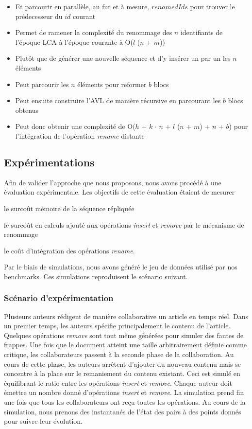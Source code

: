 \documentclass[12pt]{thesul}
\begin{document}
\begin{itemize}
  \item Et parcourir en parallèle, au fur et à mesure, $renamedIds$ pour trouver le prédecesseur du $id$ courant
  \item Permet de ramener la complexité du renommage des $n$ identifiants de l'époque \ac{LCA} à l'époque courante à O($l$ ($n$ + $m$))
  \item Plutôt que de générer une nouvelle séquence et d'y insérer un par un les $n$ éléments
  \item Peut parcourir les $n$ éléments pour reformer $b$ blocs
  \item Peut ensuite construire l'AVL de manière récursive en parcourant les $b$ blocs obtenus
  \item Peut donc obtenir une complexité de O($h$ + $k$ $\cdot$ $n$ + $l$ ($n$ + $m$) + $n$ + $b$) pour l'intégration de l'opération \emph{rename} distante
\end{itemize}

\subsection{Expérimentations}

Afin de valider l'approche que nous proposons, nous avons procédé à une évaluation expérimentale.
Les objectifs de cette évaluation étaient de mesurer
\begin{enumerate*}[label=(\roman*)]
  \item le surcoût mémoire de la séquence répliquée
  \item le surcoût en calculs ajouté aux opérations \emph{insert} et \emph{remove} par le mécanisme de renommage
  \item le coût d'intégration des opérations \emph{rename}.
\end{enumerate*}

Par le biais de simulations, nous avons généré le jeu de données utilisé par nos benchmarks.
Ces simulations reproduisent le scénario suivant.

\subsubsection{Scénario d'expérimentation}

Plusieurs auteurs rédigent de manière collaborative un article en temps réel.
Dans un premier temps, les auteurs spécifie principalement le contenu de l'article.
Quelques opérations \emph{remove} sont tout même générées pour simuler des fautes de frappes.
Une fois que le document atteint une taille arbitrairement définie comme critique, les collaborateurs passent à la seconde phase de la collaboration.
Au cours de cette phase, les auteurs arrêtent d'ajouter du nouveau contenu mais se concentre à la place sur le remaniement du contenu existant.
Ceci est simulé en équilibrant le ratio entre les opérations \emph{insert} et \emph{remove}.
Chaque auteur doit émettre un nombre donné d'opérations \emph{insert} et \emph{remove}.
La simulation prend fin une fois que tous les collaborateurs ont reçu toutes les opérations.
Au cours de la simulation, nous prenons des instantanés de l'état des pairs à des points donnés pour suivre leur évolution.
\end{document}
